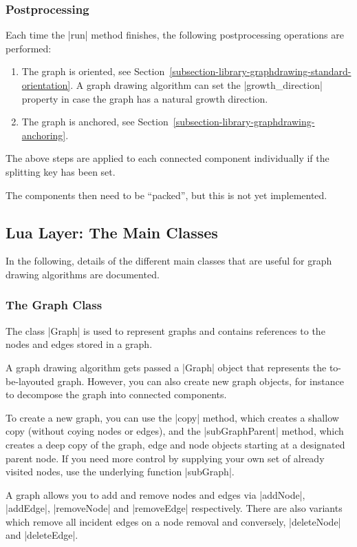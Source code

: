 \subsubsection{Postprocessing}

Each time the |run| method finishes, the following postprocessing
operations are performed:
\begin{enumerate}
\item The graph is oriented, see
  Section~\ref{subsection-library-graphdrawing-standard-orientation}. A
  graph drawing algorithm can set the |growth_direction| property in
  case the graph has a natural growth direction. 
\item The graph is anchored, see
  Section~\ref{subsection-library-graphdrawing-anchoring}. 
\end{enumerate}
The above steps are applied to each connected component individually
if the splitting key has been set.

The components then need to be ``packed'', but this is not yet
implemented.


\subsection{Lua Layer: The Main Classes}

In the following, details of the different main classes that are
useful for graph drawing algorithms are documented.


\subsubsection{The Graph Class}

The class |Graph| is used to represent graphs and contains
references to the nodes and edges stored in a graph.

A graph drawing algorithm gets passed a |Graph| object that represents
the to-be-layouted graph. However, you can also create new graph
objects, for instance to decompose the graph into connected
components. 

To create a new graph, you can use the |copy| method, which creates a 
shallow copy (without coying nodes or edges), and the
|subGraphParent| method, which creates a deep copy of the graph, edge
and node objects starting at a designated parent node. If you need
more control by supplying your own set of already visited nodes, use
the underlying function |subGraph|.

A graph allows you to add and remove nodes and edges via |addNode|,
|addEdge|, |removeNode| and |removeEdge| respectively.  There are also
variants which remove all incident edges on a node removal and
conversely, |deleteNode| and |deleteEdge|.

